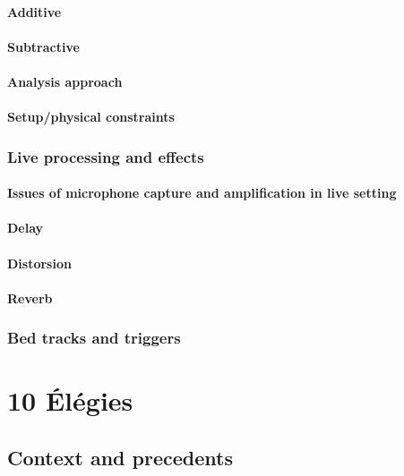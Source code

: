 \documentclass[12pt,twoside,maitrise]{dms}
\theoremstyle{definition}
\begin{document}
\subsubsection{Additive}

\subsubsection{Subtractive}

\subsubsection{Analysis approach}

\subsubsection{Setup/physical constraints}

\subsection{Live processing and effects}

\subsubsection{Issues of microphone capture and amplification in live setting}

\subsubsection{Delay}

\subsubsection{Distorsion}

\subsubsection{Reverb}

\subsection{Bed tracks and triggers}

\chapter{10 Élégies}

\section{Context and precedents}
\end{document}
